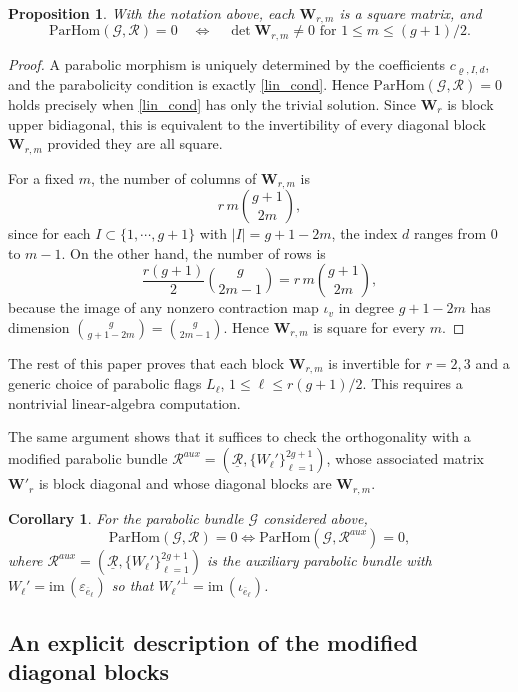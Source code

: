 \documentclass[12pt, letterpaper]{amsart}
\newtheorem{proposition}[theorem]{Proposition}
\newtheorem{corollary}[theorem]{Corollary}
\theoremstyle{definition}
\newcommand{\cG}{\mathcal{G} }
\newcommand{\cR}{\mathcal{R} }
\newcommand{\bW}{\mathbf{W} }
\newcommand{\pHom}{\mathrm{ParHom}}
\def\im{\mathrm{im}\, }
\begin{document}
\begin{proposition}\label{prop:matrixcriterion}
With the notation above, each \(\bW_{r,m}\) is a square matrix, and
\[\pHom(\cG,\cR)=0\quad\Longleftrightarrow\quad\det \bW_{r,m}\ne0\text{ for }1\le m\le (g+1)/2.\]
\end{proposition}

\begin{proof}
A parabolic morphism is uniquely determined by the coefficients \(c_{\varrho,I,d}\), and the parabolicity condition is exactly \eqref{lin_cond}. Hence \(\pHom(\cG,\cR)=0\) holds precisely when \eqref{lin_cond} has only the trivial solution. Since \(\bW_r\) is block upper bidiagonal, this is equivalent to the invertibility of every diagonal block \(\bW_{r,m}\) provided they are all square.

For a fixed \(m\), the number of columns of \(\bW_{r,m}\) is
\[r\,m\binom{g+1}{2m},\]
since for each \(I\subset\{1,\cdots,g+1\}\) with \(|I|=g+1-2m\), the index \(d\) ranges from \(0\) to \(m-1\). On the other hand, the number of rows is
\[\frac{r(g+1)}{2}\binom{g}{2m-1}=r\,m\binom{g+1}{2m},\]
because the image of any nonzero contraction map \(\iota_v\) in degree \(g+1-2m\) has dimension \(\binom{g}{g+1-2m}=\binom{g}{2m-1}\). Hence \(\bW_{r,m}\) is square for every \(m\).
\end{proof}

The rest of this paper proves that each block \(\bW_{r,m}\) is invertible for \(r=2,3\) and a generic choice of parabolic flags \(L_{\ell}\), \(1 \le \ell \le r(g+1)/2\). This requires a nontrivial linear-algebra computation.

The same argument shows that it suffices to check the orthogonality with a modified parabolic bundle \(\cR^{aux} = (\underline{\cR}, \{W_\ell'\}_{\ell = 1}^{2g+1})\), whose associated matrix \(\bW'_r\) is block diagonal and whose diagonal blocks are \(\bW_{r,m}\).

\begin{corollary}\label{cor:diagonal_reduction}
For the parabolic bundle \(\cG\) considered above,
\[\pHom(\cG,\cR)=0\iff\pHom(\cG,\cR^{aux})=0,\]
where \(\cR^{aux}=(\underline{\cR},\{W_\ell'\}_{\ell=1}^{2g+1})\) is the auxiliary parabolic bundle with \(W_\ell'=\im(\varepsilon_{\overline e_\ell})\) so that \(W_\ell'^\perp=\im(\iota_{\overline e_\ell})\).
\end{corollary}

\subsection{An explicit description of the modified diagonal blocks}\label{ssec:diagonalblock}
\end{document}

